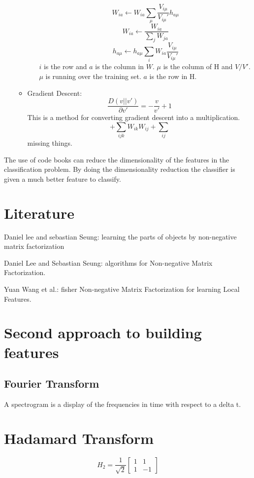 \documentclass[letterpaper, 9pt]{article}
\begin{document}
\begin{itemize}
\begin{itemize}
\begin{itemize}
\begin{equation}
W_{ia} \leftarrow W_{ia} \sum_\mu \frac{V_{i\mu}}{V_{i\mu}'}h_{a\mu}
\end{equation}
\begin{equation}
W_{ia} \leftarrow \frac{W_{ia}}{\sum_j W_{ja}}
\end{equation}
\begin{equation}
h_{a\mu} \leftarrow h_{a\mu} \sum_i W_{ia} \frac{V_{i\mu}}{V_{i\mu}'}
\end{equation}
$i$ is the row and $a$ is the column in $W$. $\mu$ is the column of H and $V/V'$. $\mu$ is running over the training set. $a$ is the row in H.
\end{itemize}
\item Gradient Descent:
\begin{equation}
\frac{D(v||v')}{\partial v'} = - \frac{v}{v'} + 1
\end{equation}
This is a method for converting gradient descent into a multiplication.
\begin{equation}
+ \sum_{ijk} W_{ik}W_{ij} + \sum_{ij}
\end{equation}
missing things.
\end{itemize}
\end{itemize}

The use of code books can reduce the dimensionality of the features in the classification problem. By doing the dimensionality reduction the classifier is given a much better feature to classify.
\section{Literature}
Daniel lee and sebastian Seung: learning the parts of objects by non-negative matrix factorization

Daniel Lee and Sebastian Seung: algorithms for Non-negative Matrix Factorization.

Yuan Wang et al.: fisher Non-negative Matrix Factorization for learning Local Features.

\section{Second approach to building features}
\subsection{Fourier Transform}
A spectrogram is a display of the frequencies in time with respect to a delta t.

\section{Hadamard Transform}
\begin{equation}
H_2 = \frac{1}{\sqrt{2}}
\begin{bmatrix}
1 & 1\\
1 & -1
\end{bmatrix}
\end{equation}
\end{document}
